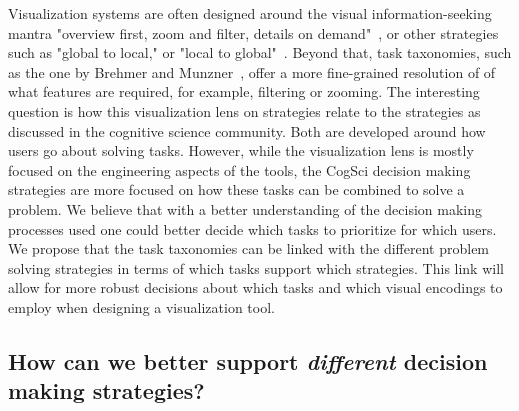 
Visualization systems are often designed around the visual information-seeking mantra "overview first, zoom and
filter, details on demand"~\cite{Shneiderman:1996}, or other strategies such as "global to local,"
or "local to global"~\cite{Sedlmair:2014}. Beyond that, task taxonomies, such as the one by Brehmer and Munzner~\citep{Brehmer:2013}, offer a more fine-grained resolution of
of what features are required, for example, filtering or zooming. 
The interesting question is how this visualization lens on strategies relate to the strategies as discussed in the cognitive science community. 
Both are developed around how users
go about solving tasks. However, while the visualization lens
is mostly focused on the engineering aspects of the tools, 
the CogSci decision making strategies are more focused on how these tasks can be combined to
solve a problem.
We believe that with a better understanding of the decision making processes 
used one could better decide which tasks to prioritize for which users.
We propose that the task taxonomies can be linked with the different problem
solving strategies in terms of which tasks support which strategies. This 
link will allow for more robust decisions about
which tasks and which visual encodings to employ when designing a 
visualization tool.




\subsection{How can we better support \emph{different} decision making strategies?}

